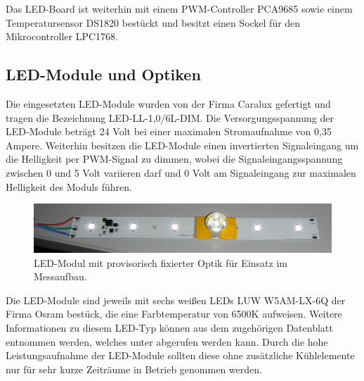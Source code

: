 \documentclass[a4paper,12pt]{scrartcl}
\begin{document}
Das LED-Board ist weiterhin mit einem PWM-Controller PCA9685 sowie einem Temperatursensor DS1820 bestückt und besitzt einen Sockel für den Mikrocontroller LPC1768.

\subsection{LED-Module und Optiken}
Die eingesetzten LED-Module wurden von der Firma Caralux gefertigt und tragen die Bezeichnung LED-LL-1,0/6L-DIM. Die Versorgungsspannung der LED-Module
betr\"agt 24 Volt bei einer maximalen Stromaufnahme von 0,35 Ampere. Weiterhin besitzen die LED-Module einen invertierten Signaleingang um die Helligkeit per
PWM-Signal zu dimmen, wobei die Signaleingangsspannung zwischen 0 und 5 Volt variieren darf und 0 Volt am Signaleingang zur maximalen Helligkeit des Moduls
f\"uhren. 

\begin{figure}[htb]
\begin{center}
  \includegraphics[width=1\hsize]{./images/foto_hardware_ledmodul.png}
\end{center}
\caption[LED-Modul der Firma Caralux mit provisorisch fixierter Optik im Messaufbau, Quelle: Autoren]{\label{fotohwledmodul}LED-Modul mit provisorisch fixierter
Optik f\"ur Einsatz im Messaufbau.}
\end{figure}
Die LED-Module sind jeweils mit sechs wei\ss{}en LEDs LUW W5AM-LX-6Q der Firma Osram best\"uck, die eine Farbtemperatur von 6500K aufweisen. Weitere Informationen zu diesem LED-Typ k\"onnen aus dem zugeh\"origen Datenblatt entnommen werden, welches unter \cite{specled} abgerufen werden kann. Durch die hohe
Leistungsaufnahme der LED-Module sollten diese ohne zus\"atzliche K\"uhlelemente nur f\"ur sehr kurze Zeitr\"aume in Betrieb genommen werden.
\end{document}
